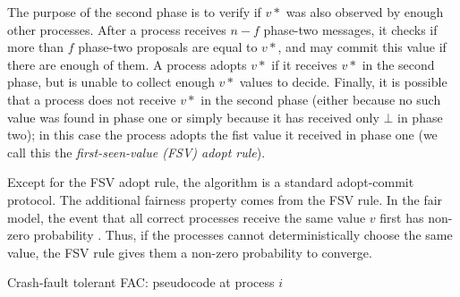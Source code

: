The purpose of the second phase is to verify if $v*$
was also observed by enough other processes.
After a process receives $n-f$ phase-two messages, it checks if more than $f$ phase-two proposals are equal to $v*$, and may commit this value if there are enough of them. A process adopts $v*$ if it receives $v*$ in the second phase, but is unable to collect enough $v*$ values to decide. Finally, it is possible that a process does not receive $v*$ in the second phase (either because no such value was found in phase one or simply because it has received only $\bot$ in phase two); in this case the process adopts the fist value it received in phase one (we call this the \textit{first-seen-value (FSV) adopt rule}).

Except for the FSV adopt rule, the algorithm is a standard adopt-commit protocol. The additional fairness property comes from the FSV rule. In the fair model, the event that all correct processes receive the same value $v$ first has non-zero probability . Thus, if the processes cannot deterministically choose the same value, the FSV rule gives them a non-zero probability to converge.  

\begin{algorithm}
\caption{Crash-fault tolerant FAC: pseudocode at process $i$}
\label{alg:aac-crash}
\end{algorithm}


